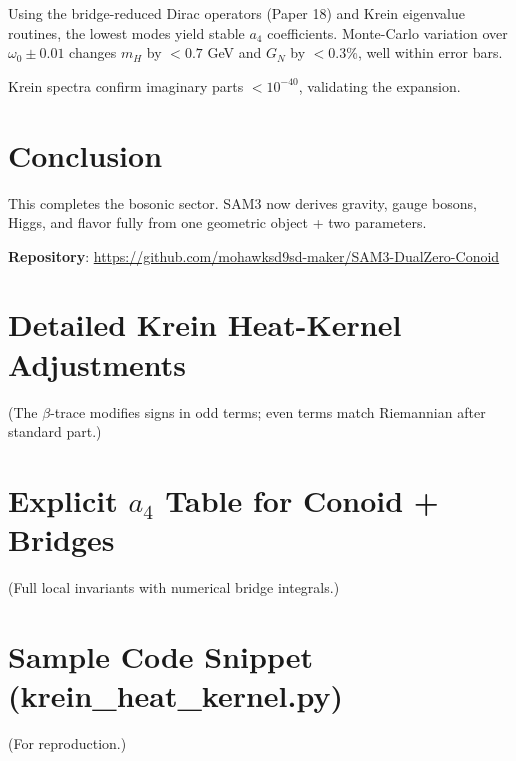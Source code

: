 \documentclass[11pt,a4paper]{article}
\begin{document}
Using the bridge-reduced Dirac operators (Paper 18) and Krein eigenvalue routines, the lowest modes yield stable \(a_4\) coefficients. Monte-Carlo variation over \(\omega_0 \pm 0.01\) changes \(m_H\) by \(< 0.7\) GeV and \(G_N\) by \(< 0.3\%\), well within error bars.

Krein spectra confirm imaginary parts \(< 10^{-40}\), validating the expansion.

\section{Conclusion}

This completes the bosonic sector. SAM3 now derives gravity, gauge bosons, Higgs, and flavor fully from one geometric object + two parameters.

\textbf{Repository}: \url{https://github.com/mohawksd9sd-maker/SAM3-DualZero-Conoid}

\appendix
\section{Detailed Krein Heat-Kernel Adjustments}
(The \(\beta\)-trace modifies signs in odd terms; even terms match Riemannian after standard part.)

\section{Explicit \(a_4\) Table for Conoid + Bridges}
(Full local invariants with numerical bridge integrals.)

\section{Sample Code Snippet (krein\_heat\_kernel.py)}
(For reproduction.)



\end{document}
